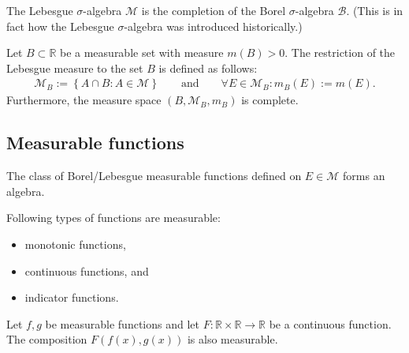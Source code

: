     \begin{property}\label{lebesgue:completion_remark}
        The Lebesgue $\sigma$-algebra $\mathcal{M}$ is the completion of the Borel $\sigma$-algebra $\mathcal{B}$. (This is in fact how the Lebesgue $\sigma$-algebra was introduced historically.)
    \end{property}

    \begin{construct}[Restriction]\label{lebesgue:restricted_lebesgue_measure}
        Let $B\subset\mathbb{R}$ be a measurable set with measure $m(B)>0$. The restriction of the Lebesgue measure to the set $B$ is defined as follows:
        \begin{gather}
            \mathcal{M}_B := \left\{A\cap B:A\in\mathcal{M}\right\}\qquad\text{and}\qquad\forall E\in\mathcal{M}_B:m_B(E) := m(E).
        \end{gather}
        Furthermore, the measure space $(B,\mathcal{M}_B,m_B)$ is complete.
    \end{construct}

\subsection{Measurable functions}


    \begin{property}
        The class of Borel/Lebesgue measurable functions defined on $E\in\mathcal{M}$ forms an algebra.
    \end{property}

    \begin{example}
        Following types of functions are measurable:
        \begin{itemize}
            \item monotonic functions,
            \item continuous functions, and
            \item indicator functions.
        \end{itemize}
    \end{example}
    \begin{result}
        Let $f,g$ be measurable functions and let $F:\mathbb{R}\times\mathbb{R}\rightarrow\mathbb{R}$ be a continuous function. The composition $F(f(x), g(x))$ is also measurable.
    \end{result}

